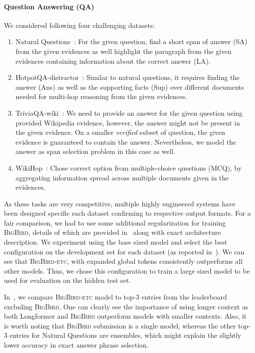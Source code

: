 \documentclass{article}
\newcommand{\bigb}{\textsc{BigBird}\xspace}
\begin{document}
\paragraph{Question Answering (QA)} 
We considered following four challenging datasets:
\vspace{-1mm}
\begin{enumerate}[leftmargin=6mm, itemsep=2mm, partopsep=0pt,parsep=0pt]
\item  Natural Questions~\citep{kwiatkowski2019natural}: 
For the given question, find a short span of answer (SA) from the given evidences as well highlight the paragraph from the given evidences 
containing information about the correct answer (LA).
\item HotpotQA-distractor~\citep{yang2018hotpotqa}: Similar to natural questions, it requires finding the answer (Ans) as well as the supporting facts (Sup) over different documents needed for multi-hop reasoning from the given evidences. 
\item TriviaQA-wiki~\citep{JoshiTriviaQA2017}: We need to provide an answer for the given question using provided Wikipedia evidence, however, the answer might not be present in the given evidence. On a smaller \emph{verified} subset of question, the given evidence is guaranteed to contain the answer. Nevertheless, we model the answer as span selection problem in this case as well.
\item  WikiHop~\citep{welbl2018constructing}: Chose correct option from multiple-choice questions (MCQ), by aggregating information spread across multiple documents given in the evidences.
\end{enumerate}
As these tasks are very competitive, multiple highly engineered systems have been designed specific each dataset confirming to respective output formats.
For a fair comparison, we had to use some additional regularization for training \bigb, details of which are provided in~ along with exact architecture description.
We experiment using the base sized model and select the best configuration on the development set for each dataset (as reported in~).
We can see that \bigb-\textsc{etc}, with expanded global tokens consistently outperforms all other models.
Thus, we chose this configuration to train a large sized model to be used for evaluation on the hidden test set.

In~, we compare \bigb-\textsc{etc} model to top-3 entries from the leaderboard excluding \bigb. 
One can clearly see the importance of using longer context as both Longformer and \bigb outperform models with smaller contexts.
Also, it is worth noting that \bigb submission is a single model, whereas the other top-3 entries for Natural Questions are  ensembles, which might explain the slightly lower accuracy in exact answer phrase selection.
\end{document}
